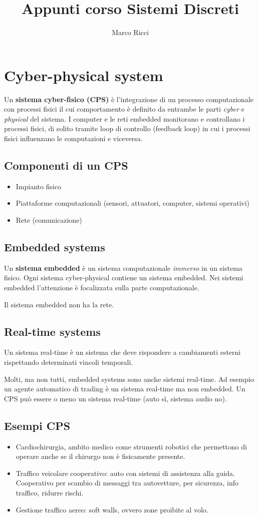 \documentclass[10pt,a4paper]{article}
\author{Marco Ricci}
\title{Appunti corso Sistemi Discreti}
\begin{document}
\tableofcontents
\newpage
\section{Cyber-physical system}
Un \textbf{sistema cyber-fisico (CPS)} è l'integrazione di un processo computazionale con processi fisici il cui comportamento è definito da entrambe le parti \textit{cyber} e \textit{physical} del sistema. I computer e le reti embedded monitorano e controllano i processi fisici, di solito tramite loop di controllo (feedback loop) in cui i processi fisici influenzano le computazioni e viceversa.
\\
\subsection{Componenti di un CPS}
\begin{itemize}
\item Impianto fisico
\item Piattaforme computazionali (sensori, attuatori, computer, sistemi operativi)
\item Rete (comunicazione)
\end{itemize}

\subsection{Embedded systems}
Un \textbf{sistema embedded} è un sistema computazionale \textit{immerso} in un sistema fisico.
Ogni sistema cyber-physical contiene un sistema embedded. Nei sistemi embedded l'attenzione è focalizzata sulla parte computazionale.

Il sistema embedded non ha la rete.

\subsection{Real-time systems}
Un sistema real-time è un sistema che deve rispondere a cambiamenti esterni rispettando determinati vincoli temporali.

Molti, ma non tutti, embedded systems sono anche sistemi real-time. Ad esempio un agente automatico di trading è un sistema real-time ma non embedded. Un CPS può essere o meno un sistema real-time (auto sì, sistema audio no).

\subsection{Esempi CPS}
\begin{itemize}
\item Cardiochirurgia, ambito medico come strumenti robotici che permettono di operare anche se il chirurgo non è fisicamente presente.
\item Traffico veicolare cooperativo: auto con sistemi di assistenza alla guida. Cooperativo per scambio di messaggi tra autovetture, per sicurezza, info traffico, ridurre rischi.
\item Gestione traffico aereo: soft walls, ovvero zone proibite al volo.
\end{itemize}
\end{document}
